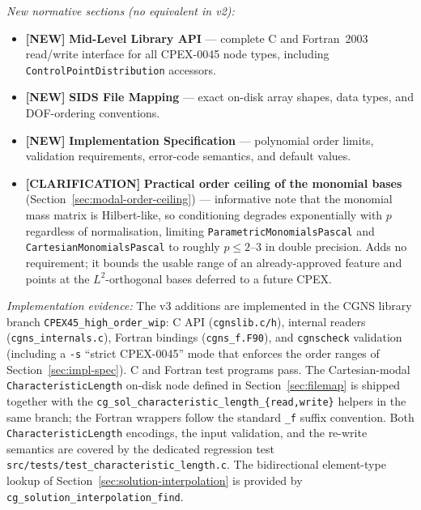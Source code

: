 \documentclass[11pt,letterpaper]{article}
\newcommand{\NEW}{\textcolor{newgreen}{\textbf{[NEW]}}}
\newcommand{\CLARIFY}{\textcolor{clarifybrown}{\textbf{[CLARIFICATION]}}}
\begin{document}
{\vspace{0.4em}
\noindent\textit{New normative sections (no equivalent in v2):}
\begin{itemize}[nosep,leftmargin=1.5em]
  \item \NEW{} \textbf{Mid-Level Library API} --- complete C and Fortran~2003
    read/write interface for all CPEX-0045 node types, including
    \texttt{ControlPointDistribution} accessors.
  \item \NEW{} \textbf{SIDS File Mapping} --- exact on-disk array shapes,
    data types, and DOF-ordering conventions.
  \item \NEW{} \textbf{Implementation Specification} --- polynomial order
    limits, validation requirements, error-code semantics, and default values.
  \item \CLARIFY{} \textbf{Practical order ceiling of the monomial bases}
    (Section~\ref{sec:modal-order-ceiling}) --- informative note that the monomial
    mass matrix is Hilbert-like, so conditioning degrades exponentially with $p$
    regardless of normalisation, limiting \texttt{ParametricMonomialsPascal} and
    \texttt{CartesianMonomialsPascal} to roughly $p \le 2$--$3$ in double precision.
    Adds no requirement; it bounds the usable range of an already-approved feature and
    points at the $L^2$-orthogonal bases deferred to a future CPEX.
\end{itemize}

\vspace{0.4em}
\noindent\textit{Implementation evidence:}
The v3 additions are implemented in the CGNS library branch
\texttt{CPEX45\_high\_order\_wip}: C API (\texttt{cgnslib.c/h}), internal
readers (\texttt{cgns\_internals.c}), Fortran bindings (\texttt{cgns\_f.F90}),
and \texttt{cgnscheck} validation (including a \texttt{-s} ``strict CPEX-0045''
mode that enforces the order ranges of Section~\ref{sec:impl-spec}).  C and
Fortran test programs pass.  The Cartesian-modal \texttt{CharacteristicLength}
on-disk node defined in Section~\ref{sec:filemap} is shipped together with the
\texttt{cg\_sol\_characteristic\_length\_\{read,write\}} helpers in the same
branch; the Fortran wrappers follow the standard \texttt{\_f} suffix convention.
Both \texttt{CharacteristicLength} encodings, the input validation, and the
re-write semantics are covered by the dedicated regression test
\texttt{src/tests/test\_characteristic\_length.c}.  The bidirectional
element-type lookup of Section~\ref{sec:solution-interpolation} is provided by
\texttt{cg\_solution\_interpolation\_find}.

}
\end{document}
